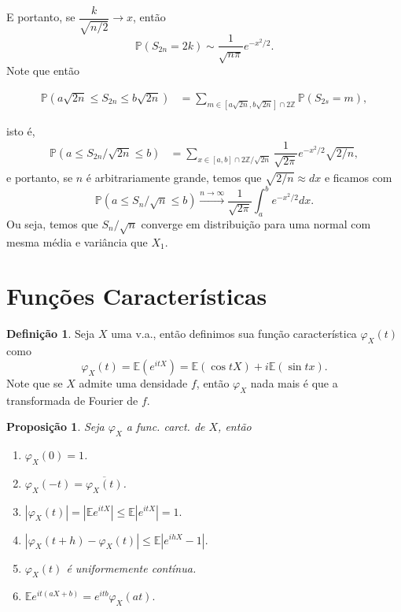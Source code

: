 \documentclass[12pt,a4paper,oneside]{book}
\newtheorem{proposition}[theorem]{Proposi\c{c}\~ao}
\theoremstyle{definition}
\newtheorem{definition}[theorem]{Defini\c{c}\~ao}
\theoremstyle{remark}
\numberwithin{equation}{section}
\newcommand{\E}{\mathbb{E}}
\newcommand{\pr}{\mathbb{P}}
\newcommand{\rarrowlimn}{\xrightarrow{n\rightarrow \infty}}
\begin{document}
E portanto, se $\dfrac{k}{\sqrt{n/2}}\rightarrow x$, então
\begin{equation}
\pr(S_{2n} = 2k )\sim \dfrac{1}{\sqrt{n\pi} }e^{-x^2/2}.
\end{equation}\label{eq-prob-randwalk}
Note que então
\begin{flushright}
\begin{align*}
\pr(a\sqrt{2n}\leq S_{2n} \leq b\sqrt{2n} )&= \sum_{m\in [a\sqrt{2n},b\sqrt{2n}]\cap 2\mathbb{Z}} \pr(S_{2s}=m),
\end{align*}
\end{flushright}
isto é,
\begin{align*}
\pr(a\leq S_{2n}/\sqrt{2n} \leq b )&= \sum_{x\in [a,b]\cap 2\mathbb{Z}/\sqrt{2n}} \dfrac{1}{\sqrt{2\pi}}e^{-x^2/2} \sqrt{2/n},
\end{align*}
e portanto, se $n$ é arbitrariamente grande, temos que $\sqrt{2/n}\approx dx$ e ficamos com 
$$\pr(a\leq S_n/\sqrt{n}\leq b) \rarrowlimn \dfrac{1}{\sqrt{2\pi}}\int_a^b  e^{-x^2/2}dx. $$
Ou seja, temos que $S_n/\sqrt{n}$ converge em distribuição para uma normal com mesma média e variância que $X_1.$




\newpage
\section{Funções Características}\label{sec-funcao caract}


\begin{definition}
Seja $X$ uma v.a., então definimos sua função característica $\varphi_X(t)$ como
$$\varphi_X(t) = \E(e^{itX}) = \E(\cos tX) + i\E(\sin tx).$$ 
Note que se $X$ admite uma densidade $f$, então $\varphi_X$ nada mais é que a transformada de Fourier de $f$.
\end{definition}


\begin{proposition}\label{prop - propriedades de func caract}
Seja $\varphi_X$ a func. carct. de $X$, então
\begin{enumerate}
\item $\varphi_X(0) = 1$. 
\item $\varphi_X(-t) = \overline{\varphi_X(t)}$.
\item $|\varphi_X(t)| = |\E e^{itX}|\leq \E|e^{itX}| = 1.$
\item $|\varphi_X(t+h) - \varphi_X(t)|\leq \E|e^{ihX} - 1|.$ 
\item $\varphi_X(t)$ é uniformemente contínua.
\item $\E e^{it(aX+b)} = e^{itb}\varphi_X(at).$
\end{enumerate}
\end{proposition}
\end{document}
